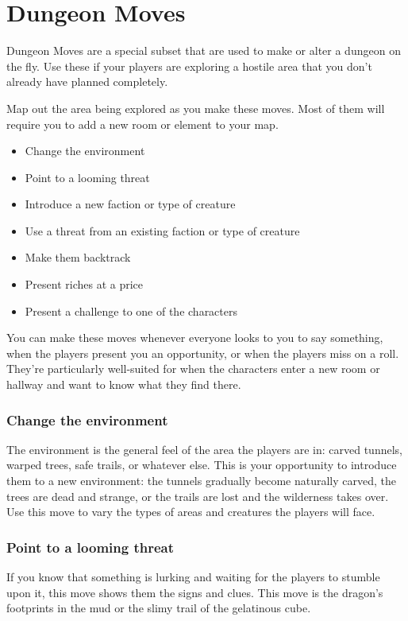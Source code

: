 \section*{Dungeon Moves}

Dungeon Moves are a special subset that are used to make or alter a dungeon on the fly. Use these if your players are exploring a hostile area that you don't already have planned completely.

Map out the area being explored as you make these moves. Most of them will require you to add a new room or element to your map.
\begin{itemize}
\item Change the environment
\item Point to a looming threat
\item Introduce a new faction or type of creature
\item Use a threat from an existing faction or type of creature
\item Make them backtrack
\item Present riches at a price
\item Present a challenge to one of the characters

\end{itemize}

You can make these moves whenever everyone looks to you to say something, when the players present you an opportunity, or when the players miss on a roll. They're particularly well-suited for when the characters enter a new room or hallway and want to know what they find there.
\subsubsection{Change the environment}

The environment is the general feel of the area the players are in: carved tunnels, warped trees, safe trails, or whatever else. This is your opportunity to introduce them to a new environment: the tunnels gradually become naturally carved, the trees are dead and strange, or the trails are lost and the wilderness takes over. Use this move to vary the types of areas and creatures the players will face.
\subsubsection{Point to a looming threat}

If you know that something is lurking and waiting for the players to stumble upon it, this move shows them the signs and clues. This move is the dragon's footprints in the mud or the slimy trail of the gelatinous cube.
